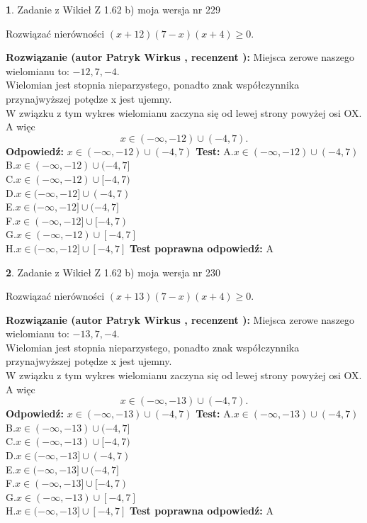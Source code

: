 \documentclass[12pt, a4paper]{article}
\theoremstyle{definition} %
\newtheorem{zad}{}
\newcommand{\zadStart}[1]{\begin{zad}#1\newline}
\newcommand{\zadStop}{\end{zad}}
\newcommand{\rozwStart}[2]{\noindent \textbf{Rozwiązanie (autor #1 , recenzent #2): }\newline}
\newcommand{\rozwStop}{\newline}
\newcommand{\odpStart}{\noindent \textbf{Odpowiedź:}\newline}
\newcommand{\odpStop}{\newline}
\newcommand{\testStart}{\noindent \textbf{Test:}\newline}
\newcommand{\testStop}{\newline}
\newcommand{\kluczStart}{\noindent \textbf{Test poprawna odpowiedź:}\newline}
\newcommand{\kluczStop}{\newline}
\begin{document}
\zadStart{Zadanie z Wikieł Z 1.62 b) moja wersja nr 229}

Rozwiązać nierówności $(x+12)(7-x)(x+4)\ge0$.
\zadStop
\rozwStart{Patryk Wirkus}{}
Miejsca zerowe naszego wielomianu to: $-12, 7, -4$.\\
Wielomian jest stopnia nieparzystego, ponadto znak współczynnika przy\linebreak najwyższej potędze x jest ujemny.\\ W związku z tym wykres wielomianu zaczyna się od lewej strony powyżej osi OX. A więc $$x \in (-\infty,-12) \cup (-4,7).$$
\rozwStop
\odpStart
$x \in (-\infty,-12) \cup (-4,7)$
\odpStop
\testStart
A.$x \in (-\infty,-12) \cup (-4,7)$\\
B.$x \in (-\infty,-12) \cup (-4,7]$\\
C.$x \in (-\infty,-12) \cup [-4,7)$\\
D.$x \in (-\infty,-12] \cup (-4,7)$\\
E.$x \in (-\infty,-12] \cup (-4,7]$\\
F.$x \in (-\infty,-12] \cup [-4,7)$\\
G.$x \in (-\infty,-12) \cup [-4,7]$\\
H.$x \in (-\infty,-12] \cup [-4,7]$
\testStop
\kluczStart
A
\kluczStop



\zadStart{Zadanie z Wikieł Z 1.62 b) moja wersja nr 230}

Rozwiązać nierówności $(x+13)(7-x)(x+4)\ge0$.
\zadStop
\rozwStart{Patryk Wirkus}{}
Miejsca zerowe naszego wielomianu to: $-13, 7, -4$.\\
Wielomian jest stopnia nieparzystego, ponadto znak współczynnika przy\linebreak najwyższej potędze x jest ujemny.\\ W związku z tym wykres wielomianu zaczyna się od lewej strony powyżej osi OX. A więc $$x \in (-\infty,-13) \cup (-4,7).$$
\rozwStop
\odpStart
$x \in (-\infty,-13) \cup (-4,7)$
\odpStop
\testStart
A.$x \in (-\infty,-13) \cup (-4,7)$\\
B.$x \in (-\infty,-13) \cup (-4,7]$\\
C.$x \in (-\infty,-13) \cup [-4,7)$\\
D.$x \in (-\infty,-13] \cup (-4,7)$\\
E.$x \in (-\infty,-13] \cup (-4,7]$\\
F.$x \in (-\infty,-13] \cup [-4,7)$\\
G.$x \in (-\infty,-13) \cup [-4,7]$\\
H.$x \in (-\infty,-13] \cup [-4,7]$
\testStop
\kluczStart
A
\kluczStop
\end{document}

